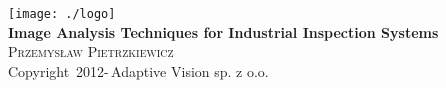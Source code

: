 \newcommand{\coverPage}[3]
{
	\begin{titlingpage}
	\begin{center}


	\texttt{[image: ./logo]}\\[5cm]    





	{ \huge \bfseries #2}\\[0.4cm]

	\textsc{\Large #1}\\[0.5cm]
	\null
	\vfill
	{\small #3}
	\end{center}
	\end{titlingpage}



	\thispagestyle{empty}	
	\newpage
}


\coverPage
{Przemys\l aw Pietrzkiewicz}
{Image Analysis Techniques for Industrial Inspection Systems}
{Copyright \textcopyright\,2012-\the\year\,Adaptive Vision sp. z o.o.}
